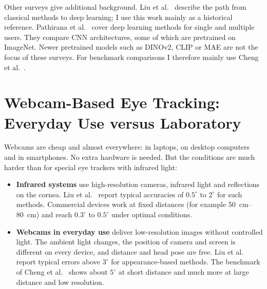 Other surveys give additional background. Liu et al.~\cite{liu2022beholder}
describe the path from classical methods to deep learning; I use this work
mainly as a historical reference. Pathirana et al.~\cite{pathirana2022survey}
cover deep learning methods for single and multiple users. They compare CNN
architectures, some of which are pretrained on ImageNet. Newer pretrained
models such as DINOv2, CLIP or MAE are not the focus of these surveys. For
benchmark comparisons I therefore mainly use Cheng et
al.~\cite{cheng2024review}.

\section{Webcam-Based Eye Tracking: Everyday Use versus Laboratory}
\label{sec:webcam}
Webcams are cheap and almost everywhere: in laptops, on desktop computers and
in smartphones. No extra hardware is needed. But the conditions are much harder
than for special eye trackers with infrared light:

\begin{itemize}
  \item \textbf{Infrared systems} use high-resolution cameras, infrared light
        and reflections on the cornea. Liu et al.~\cite{liu2022beholder} report
        typical accuracies of $0.5^\circ$ to $2^\circ$ for such methods.
        Commercial devices work at fixed distances (for example
        \SIrange{50}{80}{\centi\metre}) and reach $0.3^\circ$ to $0.5^\circ$
        under optimal conditions.
  \item \textbf{Webcams in everyday use} deliver low-resolution images without
        controlled light. The ambient light changes, the position of camera
        and screen is different on every device, and distance and head pose
        are free. Liu et al.~\cite{liu2022beholder} report typical errors above
        $3^\circ$ for appearance-based methods. The benchmark of Cheng et
        al.~\cite{cheng2024review} shows about $5^\circ$ at short distance and
        much more at large distance and low resolution.
\end{itemize}

